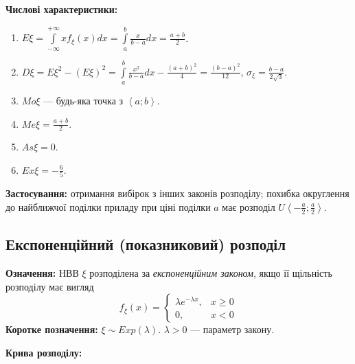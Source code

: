\noindent\textbf{Числові характеристики:}
\begin{enumerate}
    \item $E\xi = \int\limits_{-\infty}^{+\infty} x f_\xi(x)dx = \int\limits_{a}^{b} \frac{x}{b-a}dx = \frac{a+b}{2}$.
    \item $D\xi = E\xi^2 - (E\xi)^2 = \int\limits_{a}^{b} \frac{x^2}{b-a}dx - \frac{(a+b)^2}{4} = \frac{(b-a)^2}{12}$, $\sigma_\xi = \frac{b-a}{2\sqrt{3}}$.
    \item ${Mo}\xi$ --- будь-яка точка з $\left<a; b\right>$.
    \item ${Me}\xi = \frac{a+b}{2}$.
    \item ${As}\xi = 0$.
    \item ${Ex}\xi = -\frac{6}{5}$.
\end{enumerate}

\noindent\textbf{Застосування:} отримання вибірок з інших законів розподілу;
похибка округлення до найближчої поділки приладу при ціні поділки $a$ має розподіл ${U}\left<-\frac{a}{2}; \frac{a}{2}\right>$.

\subsection{Експоненційний (показниковий) розподіл}
\noindent\textbf{Означення:}
    НВВ $\xi$ розподілена за \emph{експоненційним законом}, 
    якщо її щільність розподілу має вигляд \begin{equation}
        f_\xi(x) = \begin{cases}
            \lambda e^{-\lambda x}, & x \geq 0 \\
            0, & x < 0
        \end{cases}
    \end{equation}
\textbf{Коротке позначення:} $\xi \sim {Exp}(\lambda)$.
    $\lambda > 0$ --- параметр закону.

\noindent \textbf{Крива розподілу:}


